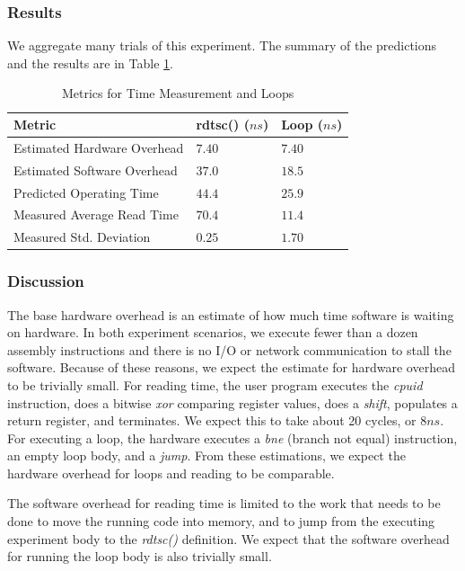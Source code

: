 \documentclass[sigconf]{acmart}
\begin{document}
\subsubsection{Results}
We aggregate many trials of this experiment. The summary of the predictions and the results are in Table \ref{MeasurementMetrics}.
 
\begin{table}[h!]
\centering
\caption{Metrics for Time Measurement and Loops}
\begin{tabular}{|l|l|l|}
\hline
\textbf{Metric}             & \textbf{rdtsc() ($ns$)}	& \textbf{Loop ($ns$)}	\\ \hline
Estimated Hardware Overhead & $7.40$ 		& $7.40$		\\ \hline
Estimated Software Overhead & $37.0$ 		& $18.5$		\\ \hline
Predicted Operating Time    & $44.4$ 		& $25.9$		\\ \hline
Measured Average Read Time  & $70.4$ 		& $11.4$		\\ \hline
Measured Std. Deviation 	& $0.25$		& $1.70$		\\ \hline
\end{tabular}
\label{MeasurementMetrics}
\end{table}

\subsubsection{Discussion}
The base hardware overhead is an estimate of how much time software is waiting on hardware. In both experiment scenarios, we execute fewer than a dozen assembly instructions and there is no I/O or network communication to stall the software. Because of these reasons, we expect the estimate for hardware overhead to be trivially small. For reading time, the user program executes the \textit{cpuid} instruction, does a bitwise \textit{xor} comparing register values, does a \textit{shift}, populates a return register, and terminates. We expect this to take about 20 cycles, or $8 ns$. For executing a loop, the hardware executes a \textit{bne} (branch not equal) instruction, an empty loop body, and a \textit{jump}. From these estimations, we expect the hardware overhead for loops and reading to be comparable.

The software overhead for reading time is limited to the work that needs to be done to move the running code into memory, and to jump from the executing experiment body to the \textit{rdtsc()} definition. We expect that the software overhead for running the loop body is also trivially small.
\end{document}
